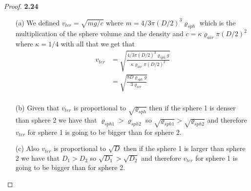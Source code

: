 \documentclass[11pt]{article}
\theoremstyle{definition}
\begin{document}
    \begin{proof}{\textbf{2.24}}
        \begin{itemize}
            \item[(a)] We defined $v_{ter} = \sqrt{mg/c}$ where
            $m = 4/3 \pi (D/2)^3\varrho_{sph}$ which is the multiplication of
            the sphere volume and the density and
            $c = \kappa \varrho_{air} \pi (D/2)^2$ where $\kappa = 1/4$ with all that we get that
            \begin{align*}
                v_{ter} &= \sqrt{\frac{4/3 \pi (D/2)^3\varrho_{sph}g}{\kappa \varrho_{air} \pi (D/2)^2}}\\
                        &= \sqrt{\frac{8 D\varrho_{sph}g}{3\varrho_{air}}}\\
            \end{align*}
\cleardoublepage
            \item[(b)] Given that $v_{ter}$ is proportional to $\sqrt{\varrho_{sph}}$
            then if the sphere 1 is denser than sphere 2 we have that
            $\varrho_{sph1} > \varrho_{sph2}$ so $\sqrt{\varrho_{sph1}} > \sqrt{\varrho_{sph2}}$
            and therefore $v_{ter}$ for sphere 1 is going to be bigger than
            for sphere 2.
            \item[(c)] Also $v_{ter}$ is proportional to $\sqrt{D}$
            then if the sphere 1 is larger   than sphere 2 we have that
            $D_1 > D_2$ so $\sqrt{D_1} > \sqrt{D_2}$
            and therefore $v_{ter}$ for sphere 1 is going to be bigger than
            for sphere 2. 
        \end{itemize}
    \end{proof}
\end{document}
